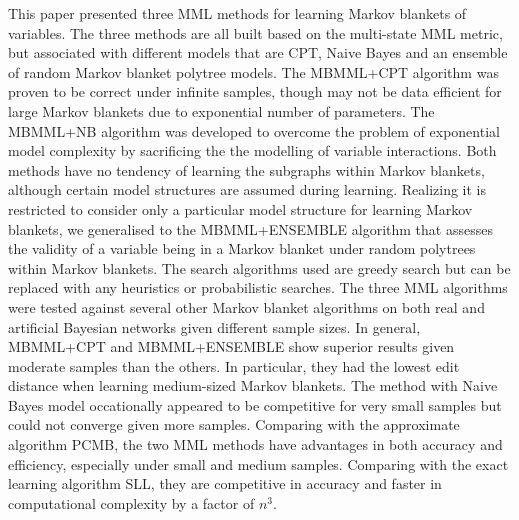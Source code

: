 This paper presented three MML methods for learning Markov blankets of variables. The three methods are all built based on the multi-state MML metric, but associated with different models that are CPT, Naive Bayes and an ensemble of random Markov blanket polytree models. The MBMML+CPT algorithm was proven to be correct under infinite samples, though may not be data efficient for large Markov blankets due to exponential number of parameters. The MBMML+NB algorithm was developed to overcome the problem of exponential model complexity by sacrificing the the modelling of variable interactions. Both methods have no tendency of learning the subgraphs within Markov blankets, although certain model structures are assumed during learning. Realizing it is restricted to consider only a particular model structure for learning Markov blankets, we generalised to the MBMML+ENSEMBLE algorithm that assesses the validity of a variable being in a Markov blanket under random polytrees within Markov blankets. The search algorithms used are greedy search but can be replaced with any heuristics or probabilistic searches. The three MML algorithms were tested against several other Markov blanket algorithms on both real and artificial Bayesian networks given different sample sizes. In general, MBMML+CPT and MBMML+ENSEMBLE show superior results given moderate samples than the others. In particular, they had the lowest edit distance when learning medium-sized Markov blankets. The method with Naive Bayes model occationally appeared to be competitive for very small samples but could not converge given more samples. Comparing with the approximate algorithm PCMB, the two MML methods have advantages in both accuracy and efficiency, especially under small and medium samples. Comparing with the exact learning algorithm SLL, they are competitive in accuracy and faster in computational complexity by a factor of $n^3$. 

